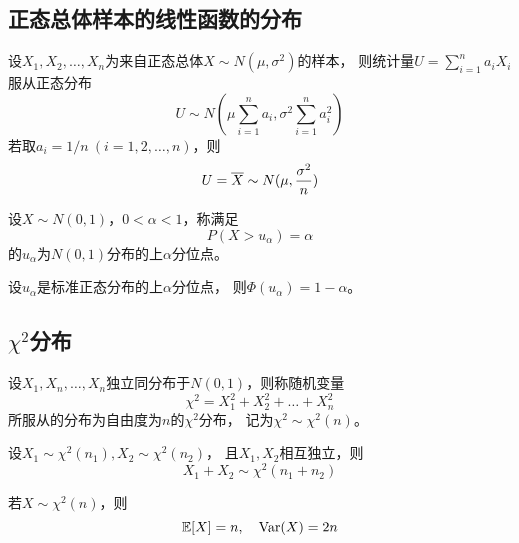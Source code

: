 \subsection{正态总体样本的线性函数的分布}
\begin{theorem}
  设$X_1,X_2,\dots,X_n$为来自正态总体$X\sim N(\mu,\sigma^2)$的样本，
  则统计量$U=\sum_{i=1}^{n}a_iX_i$服从正态分布
  \begin{displaymath}
    U\sim N\left(\mu\sum_{i=1}^{n}a_i,\sigma^2\sum_{i=1}^{n}a_i^2\right)
  \end{displaymath}
  若取$a_i=1/n\ (i=1,2,\dots,n)$，则
  \begin{displaymath}
    U = \overline{X} \sim N(\mu, \frac{\sigma^2}{n})
  \end{displaymath}
\end{theorem}

\begin{definition}
  设$X\sim N(0,1)$，$0<\alpha<1$，称满足
  \begin{displaymath}
    P(X>u_\alpha) = \alpha
  \end{displaymath}
  的$u_\alpha$为$N(0,1)$分布的上$\alpha$分位点。
\end{definition}

\begin{theorem}
  设$u_\alpha$是标准正态分布的上$\alpha$分位点，
  则$\Phi(u_\alpha)=1-\alpha$。
\end{theorem}

\subsection{$\chi^2$分布}
\begin{definition}[$\chi^2$分布]
  设$X_1,X_n,\dots,X_n$独立同分布于$N(0,1)$，则称随机变量
  \begin{displaymath}
    \chi^2 = X_1^2+X_2^2+\dots+X_n^2
  \end{displaymath}
  所服从的分布为自由度为$n$的$\chi^2$分布，
  记为$\chi^2\sim\chi^2(n)$。
\end{definition}

\begin{theorem}
  设$X_1\sim\chi^2(n_1), X_2\sim\chi^2(n_2)$，
  且$X_1,X_2$相互独立，则
  \begin{displaymath}
    X_1+X_2\sim\chi^2(n_1+n_2)
  \end{displaymath}
\end{theorem}

\begin{theorem}
  若$X\sim\chi^2(n)$，则
  \begin{displaymath}
    \mathbb{E}[X] = n,\quad \textrm{Var}(X) = 2n
  \end{displaymath}
\end{theorem}

